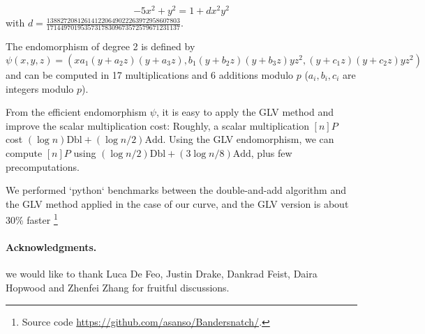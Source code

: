 \documentclass{amsart}
\begin{document}
$$-5x^2+y^2 = 1+dx^2y^2$$ with
$d=\frac{138827208126141220649022263972958607803}{171449701953573178309673572579671231137}$.

\medskip
The endomorphism of degree 2 is defined by
$$\psi(x,y,z) = (xa_1(y+a_2z)(y+a_3z), b_1(y+b_2z)(y+b_3z)yz^2, (y+c_1z)(y+c_2z)yz^2)$$
and can be computed in 17 multiplications and 6 additions modulo $p$ ($a_i, b_i, c_i$ are integers modulo $p$).

From the efficient endomorphism $\psi$, it is easy to apply the GLV method and improve the scalar multiplication cost:
Roughly, a scalar multiplication $[n]P$ cost $(\log n) \text{Dbl} + (\log n/2) \text{Add}$.
Using the GLV endomorphism, we can compute $[n]P$ using $(\log n/2 )\text{Dbl} + (3\log n/8) \text{Add}$, plus few precomputations.

We performed `python` benchmarks between the double-and-add algorithm and the GLV method applied in the case of our curve, and the GLV version is about 30\% faster 
\footnote{Source code \url{https://github.com/asanso/Bandersnatch/}.}

\bigskip
\paragraph*{\textbf{Acknowledgments.}} we would like to thank Luca De Feo, Justin Drake, Dankrad Feist, Daira Hopwood and Zhenfei Zhang for fruitful discussions.

{}

\end{document}
